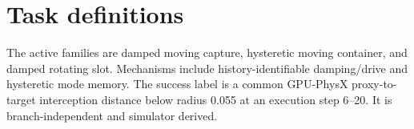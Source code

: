 \section{Task definitions}
The active families are damped moving capture, hysteretic moving container, and damped rotating slot. Mechanisms include history-identifiable damping/drive and hysteretic mode memory. The success label is a common GPU-PhysX proxy-to-target interception distance below radius 0.055 at an execution step 6--20. It is branch-independent and simulator derived.
